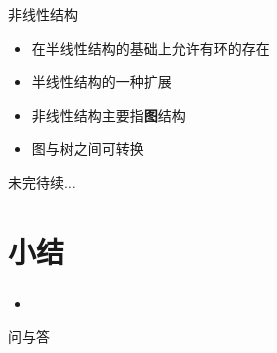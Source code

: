 \begin{frame}
    \begin{block}{非线性结构}
        \begin{itemize}
            \item 在半线性结构的基础上允许有环的存在
            \item 半线性结构的一种扩展
            \item 非线性结构主要指\textbf{图}结构
            \item 图与树之间可转换
        \end{itemize}
    \end{block}
\end{frame}






\begin{standout}[]
    未完待续$\dots$
\end{standout}

\section{小结}

\begin{frame}
    \frametitle{\insertsectionhead}
    \begin{itemize}
        \item
    \end{itemize}
\end{frame}

\begin{standout}[]
    问与答
\end{standout}